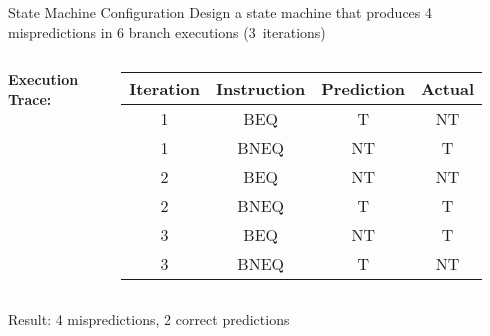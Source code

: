 \documentclass[aspectratio=169,12pt]{beamer}
\begin{document}
\begin{frame}{State Machine Configuration}
\textbf{} Design a state machine that produces 4 mispredictions in 6 branch executions (3~iterations)

\pause
\begin{center}
\end{center}
\begin{columns}
\textbf{Execution Trace:}
\begin{table}
\centering
\scriptsize
\begin{tabular}{|c|c|c|c|}
\hline
\textbf{Iteration} & \textbf{Instruction} & \textbf{Prediction} & \textbf{Actual} \\
\hline
1 & BEQ & T & NT \\
1 & BNEQ & NT & T \\
2 & BEQ & NT & NT \\
2 & BNEQ & T & T \\
3 & BEQ & NT & T \\
3 & BNEQ & T & NT \\
\hline
\end{tabular}
\end{table}
\end{columns}

Result: 4 mispredictions, 2 correct predictions
\end{frame}
\end{document}
